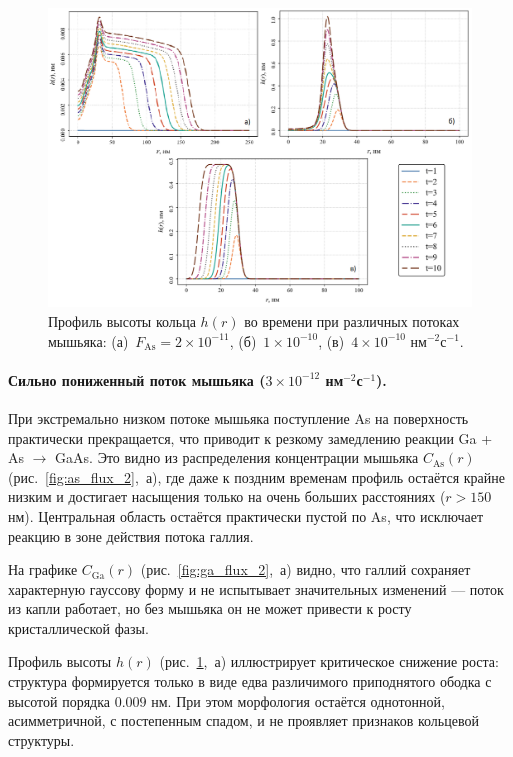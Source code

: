 \documentclass[14pt,oneside]{extarticle}
\begin{document}
\begin{figure}
    \begin{center}
    \includegraphics[width=18cm]{images/h_t_2.png}
    \caption{\label{fig:h_flux_2} Профиль высоты кольца $h(r)$ во времени при различных потоках мышьяка: (а)~$F_{\text{As}} = 2 \times 10^{-11}$, (б)~$1 \times 10^{-10}$, (в)~$4 \times 10^{-10}$ нм$^{-2}$с$^{-1}$.}
    \end{center}
\end{figure}


\paragraph{Сильно пониженный поток мышьяка (\(3 \times 10^{-12}\) нм$^{-2}$с$^{-1}$).}

При экстремально низком потоке мышьяка поступление As на поверхность практически прекращается, что приводит к резкому замедлению реакции Ga + As $\rightarrow$ GaAs. Это видно из распределения концентрации мышьяка $C_{\text{As}}(r)$ (рис.~\ref{fig:as_flux_2},~а), где даже к поздним временам профиль остаётся крайне низким и достигает насыщения только на очень больших расстояниях ($r > 150$ нм). Центральная область остаётся практически пустой по As, что исключает реакцию в зоне действия потока галлия.

На графике $C_{\text{Ga}}(r)$ (рис.~\ref{fig:ga_flux_2},~а) видно, что галлий сохраняет характерную гауссову форму и не испытывает значительных изменений — поток из капли работает, но без мышьяка он не может привести к росту кристаллической фазы.

Профиль высоты $h(r)$ (рис.~\ref{fig:h_flux_2},~а) иллюстрирует критическое снижение роста: структура формируется только в виде едва различимого приподнятого ободка с высотой порядка $0.009$ нм. При этом морфология остаётся однотонной, асимметричной, с постепенным спадом, и не проявляет признаков кольцевой структуры.
\end{document}
